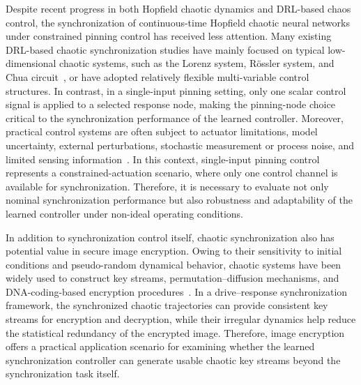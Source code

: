 \documentclass[10pt,twocolumn]{article}
\theoremstyle{definition}
\begin{document}
Despite recent progress in both Hopfield chaotic dynamics and DRL-based chaos control, the synchronization of continuous-time Hopfield chaotic neural networks under constrained pinning control has received less attention. Many existing DRL-based chaotic synchronization studies have mainly focused on typical low-dimensional chaotic systems, such as the Lorenz system, Rössler system, and Chua circuit~\cite{cheng2023deep,cheng2025generalized}, or have adopted relatively flexible multi-variable control structures. In contrast, in a single-input pinning setting, only one scalar control signal is applied to a selected response node, making the pinning-node choice critical to the synchronization performance of the learned controller. 
Moreover, practical control systems are often subject to actuator limitations, model uncertainty, external perturbations, stochastic measurement or process noise, and limited sensing information~\cite{zhang2011weak,cao2024synchronisation,weissenbacher2025reinforcement}. In this context, single-input pinning control represents a constrained-actuation scenario, where only one control channel is available for synchronization. Therefore, it is necessary to evaluate not only nominal synchronization performance but also robustness and adaptability of the learned controller under non-ideal operating conditions.

In addition to synchronization control itself, chaotic synchronization also has potential value in secure image encryption. Owing to their sensitivity to initial conditions and pseudo-random dynamical behavior, chaotic systems have been widely used to construct key streams, permutation--diffusion mechanisms, and DNA-coding-based encryption procedures~\cite{zia2022survey,zhang2023chaos,wang2019color,cuomo1993circuit,li2007analog}. In a drive--response synchronization framework, the synchronized chaotic trajectories can provide consistent key streams for encryption and decryption, while their irregular dynamics help reduce the statistical redundancy of the encrypted image. Therefore, image encryption offers a practical application scenario for examining whether the learned synchronization controller can generate usable chaotic key streams beyond the synchronization task itself.
\end{document}
